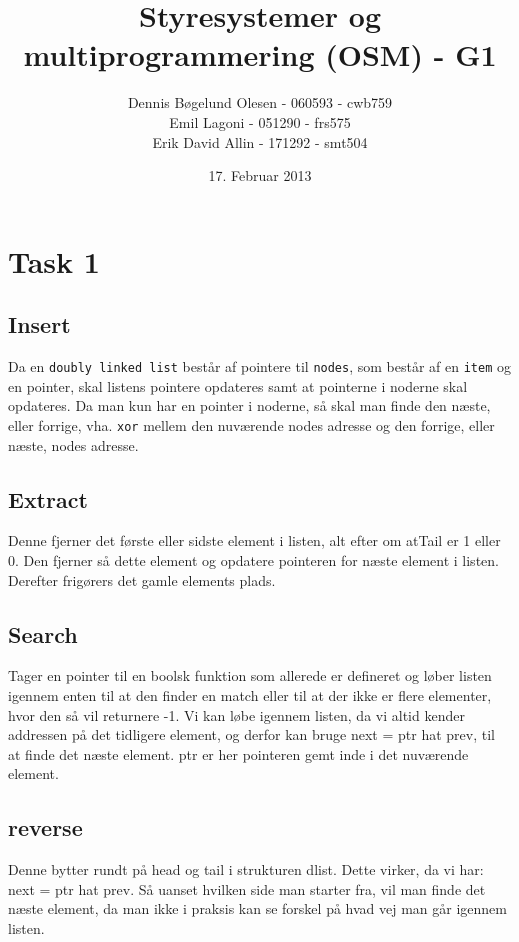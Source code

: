 \documentclass[a4paper,12pt]{article}
\title{Styresystemer og multiprogrammering (OSM) - G1}
\author{Dennis Bøgelund Olesen - 060593 - cwb759 \\ Emil Lagoni - 051290 - frs575 \\ Erik David Allin - 171292 - smt504}
\date{17. Februar 2013}
\begin{document}
\maketitle %
\thispagestyle{empty}
\setcounter{page}{0}
\newpage



\section*{Task 1}
\subsection*{Insert}
Da en \texttt{doubly linked list} består af pointere til \texttt{nodes}, som består af en \texttt{item} og en pointer, skal listens pointere opdateres samt at pointerne i noderne skal opdateres. Da man kun har en pointer i noderne, så skal man finde den næste, eller forrige, vha. \texttt{xor} mellem den nuværende nodes adresse og den forrige, eller næste, nodes adresse.
\subsection*{Extract}
Denne fjerner det første eller sidste element i listen, alt efter om atTail er 1 eller 0. Den fjerner så dette element og opdatere pointeren for næste element i listen. Derefter frigørers det gamle  elements plads.
\subsection*{Search}
Tager en pointer til en boolsk funktion som allerede er defineret og løber listen igennem enten til at den finder en match eller til at der ikke er flere elementer, hvor den så vil returnere -1.
Vi kan løbe igennem listen, da vi altid kender addressen på det tidligere element, og derfor kan bruge next = ptr hat  prev, til at finde det næste element. ptr er her pointeren gemt inde i det nuværende element.
\subsection*{reverse}
Denne bytter rundt på head og tail i strukturen dlist. Dette virker, da vi har:\\
next = ptr hat prev. Så uanset hvilken side man starter fra, vil man finde det næste element, da man ikke i praksis kan se forskel på hvad vej man går igennem listen.
\end{document}
